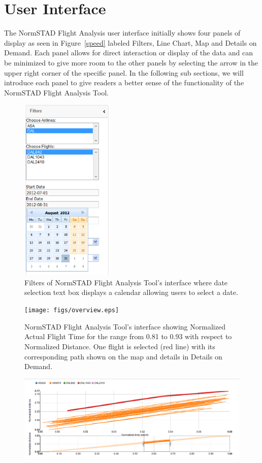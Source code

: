 \documentclass{sig-alternate}
\begin{document}
\section{User Interface}
\label{sec-interface}

The NormSTAD Flight Analysis user interface initially shows four panels of display as seen in 
Figure~\ref{speed} labeled Filters, Line Chart, Map and Details on Demand. Each panel allows for 
direct interaction or display of the data and can be minimized to
give more room to the other panels by selecting 
the arrow in the upper right corner of the specific panel. In the following sub sections, we 
will introduce each panel to give readers a better sense of the functionality of the 
NormSTAD Flight Analysis Tool.

\begin{figure}
\centering
\includegraphics[height=3.5in]{figs/calendar.eps}
\caption{
	Filters of NormSTAD Flight Analysis Tool's interface where date selection text box
displays a calendar allowing users to select a date.
}
\label{calendar}
\end{figure}


\begin{figure}
\centering
\texttt{[image: figs/overview.eps]}
\caption{
NormSTAD Flight Analysis Tool's interface showing Normalized Actual Flight Time
for the range from 0.81 to 0.93 with 
respect to Normalized Distance. One flight is selected (red line) with its 
corresponding path shown on the map and details in Details on Demand.
}
\label{overview}
\end{figure}

\begin{figure}
\centering
\includegraphics[width=\textwidth]{figs/outlier.eps}
\caption{}
\label{outlier}
\end{figure}
\end{document}
